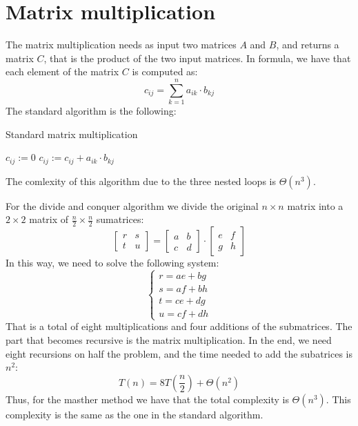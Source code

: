 \section{Matrix multiplication}

The matrix multiplication needs as input two matrices $A$ and $B$, and returns a matrix $C$, that is the product of the two input matrices. 
In formula, we have that each element of the matrix $C$ is computed as: 
\[c_{ij}=\sum_{k=1}^{n}a_{ik}\cdot b_{kj}\]
The standard algorithm is the following: 
\begin{algorithm}[H]
    \caption{Standard matrix multiplication}
        \begin{algorithmic}[1]
                    \State $c_{ij} := 0$
                        \State $c_{ij} := c_{ij}+a_{ik}\cdot b_{kj}$
                    \EndFor
                \EndFor
            \EndFor
        \end{algorithmic}
\end{algorithm}
The comlexity of this algorithm due to the three nested loops is $\Theta(n^3)$.

For the divide and conquer algorithm we divide the original $n\times n$ matrix into a $2 \times 2$ matrix of $\frac{n}{2}\times\frac{n}{2}$ sumatrices: 
\[\begin{bmatrix} r & s \\ t & u \end{bmatrix}=\begin{bmatrix} a & b \\ c & d \end{bmatrix} \cdot \begin{bmatrix} e & f \\ g & h \end{bmatrix}\]
In this way, we need to solve the following system: 
\[\begin{cases} r = ae + bg \\ s = af + bh \\ t = ce + dg \\ u = cf + dh \end{cases}\]
That is a total of eight multiplications and four additions of the submatrices.
The part that becomes recursive is the matrix multiplication.
In the end, we need eight recursions on half the problem, and the time needed to add the subatrices is $n^2$: 
\[T(n)=8T\left(\dfrac{n}{2}\right)+\Theta(n^2)\]
Thus, for the masther method we have that the total complexity is $\Theta(n^3)$. 
This complexity is the same as the one in the standard algorithm. 


